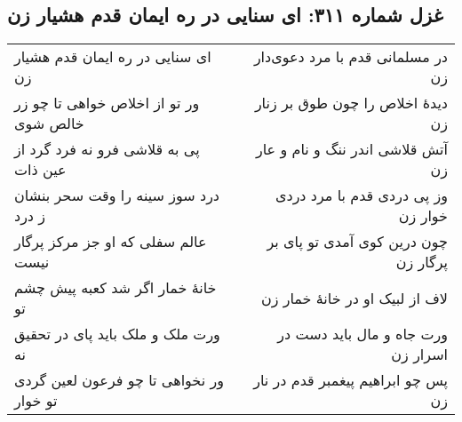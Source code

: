 \begin{center}
\section*{غزل شماره ۳۱۱: ای سنایی در ره ایمان قدم هشیار زن}
\label{sec:311}
\begin{longtable}{l p{0.5cm} r}
ای سنایی در ره ایمان قدم هشیار زن
&&
در مسلمانی قدم با مرد دعوی‌دار زن
\\
ور تو از اخلاص خواهی تا چو زر خالص شوی
&&
دیدهٔ اخلاص را چون طوق بر زنار زن
\\
پی به قلاشی فرو نه فرد گرد از عین ذات
&&
آتش قلاشی اندر ننگ و نام و عار زن
\\
درد سوز سینه را وقت سحر بنشان ز درد
&&
وز پی دردی قدم با مرد دردی خوار زن
\\
عالم سفلی که او جز مرکز پرگار نیست
&&
چون درین کوی آمدی تو پای بر پرگار زن
\\
خانهٔ خمار اگر شد کعبه پیش چشم تو
&&
لاف از لبیک او در خانهٔ خمار زن
\\
ورت ملک و ملک باید پای در تحقیق نه
&&
ورت جاه و مال باید دست در اسرار زن
\\
ور نخواهی تا چو فرعون لعین گردی تو خوار
&&
پس چو ابراهیم پیغمبر قدم در نار زن
\\
\end{longtable}
\end{center}
